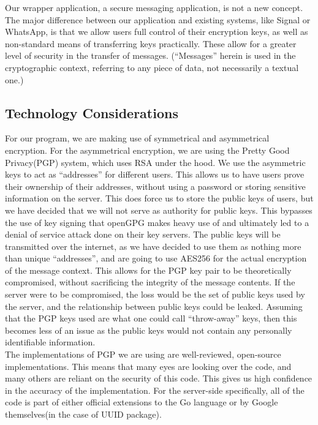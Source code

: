 \documentclass[11pt]{article}
\begin{document}
Our wrapper application, a secure messaging application, is not a new concept. The major difference between our application and existing systems, like Signal or WhatsApp, is that we allow users full control of their encryption keys, as well as non-standard means of transferring keys practically. These allow for a greater level of security in the transfer of messages. (“Messages” herein is used in the cryptographic context, referring to any piece of data, not necessarily a textual one.)

\subsection{Technology Considerations}
For our program, we are making use of symmetrical and asymmetrical encryption. For the asymmetrical encryption, we are using the Pretty Good Privacy(PGP) system, which uses RSA under the hood. We use the asymmetric keys to act as “addresses” for different users. This allows us to have users prove their ownership of their addresses, without using a password or storing sensitive information on the server. This does force us to store the public keys of users, but we have decided that we will not serve as authority for public keys. This bypasses the use of key signing that openGPG makes heavy use of and ultimately led to a denial of service attack done on their key servers. The public keys will be transmitted over the internet, as we have decided to use them as nothing more than unique “addresses”, and are going to use AES256 for the actual encryption of the message context. This allows for the PGP key pair to be  theoretically compromised, without sacrificing the integrity of the message contents. If the server were to be compromised, the loss would be the set of public keys used by the server, and the relationship between public keys could be leaked. Assuming that the PGP keys used are what one could call “throw-away” keys, then this becomes less of an issue as the public keys would not contain any personally identifiable information.\\

The implementations of PGP we are using are well-reviewed, open-source implementations. This means that many eyes are looking over the code, and many others are reliant on the security of this code. This gives us high confidence in the accuracy of the implementation. For the server-side specifically, all of the code is part of either official extensions to the Go language or by Google themselves(in the case of UUID package).
\end{document}
